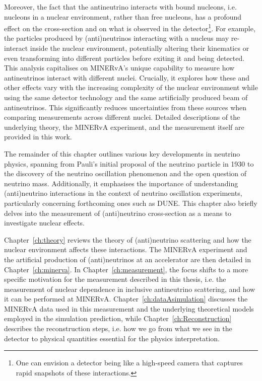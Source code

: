 Moreover, the fact that the antineutrino interacts with bound nucleons, i.e. nucleons in a nuclear environment, rather than free nucleons, has a profound effect on the cross-section and on what is observed in the detector\footnote{One can envision a detector being like a high-speed camera that captures rapid snapshots of these interactions.}. For example, the particles produced by (anti)neutrinos interacting with a nucleus may re-interact inside the nuclear environment, potentially altering their kinematics or even transforming into different particles before exiting it and being detected. This analysis capitalises on MINERvA's unique capability to measure how antineutrinos interact with different nuclei. Crucially, it explores how these and other effects vary with the increasing complexity of the nuclear environment while using the same detector technology and the same artificially produced beam of antineutrinos. This significantly reduces uncertainties from these sources when comparing measurements across different nuclei. Detailed descriptions of the underlying theory, the MINERvA experiment, and the measurement itself are provided in this work.

The remainder of this chapter outlines various key developments in neutrino physics, spanning from Pauli's initial proposal of the neutrino particle in 1930 to the discovery of the neutrino oscillation phenomenon and the open question of neutrino mass. Additionally, it emphasises the importance of understanding (anti)neutrino interactions in the context of neutrino oscillation experiments, particularly concerning forthcoming ones such as DUNE. This chapter also briefly delves into the measurement of (anti)neutrino cross-section as a means to investigate nuclear effects.

Chapter~\ref{ch:theory} reviews the theory of (anti)neutrino scattering and how the nuclear environment affects these interactions. The MINERvA experiment and the artificial production of (anti)neutrinos at an accelerator are then detailed in Chapter~\ref{ch:minerva}. In Chapter~\ref{ch:measurement}, the focus shifts to a more specific motivation for the measurement described in this thesis, i.e. the measurement of nuclear dependence in inclusive antineutrino scattering, and how it can be performed at MINERvA. Chapter~\ref{ch:dataAsimulation} discusses the MINERvA data used in this measurement and the underlying theoretical models employed in the simulation prediction, while Chapter~\ref{ch:Reconstruction} describes the reconstruction steps, i.e. how we go from what we see in the detector to physical quantities essential for the physics interpretation.


